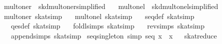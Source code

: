 \begin{isabellebody}
{}%
\endisatagML
{\isafoldML}%
%
\isadelimML
\isanewline
%
\endisadelimML
\isanewline
{}\isamarkupfalse%
\ mult{}oner\ {}\ skd{}mult{}oner{}simplified{}\isanewline
\ \ \ mult{}onel\ {}\ skd{}mult{}onel{}simplified{}\isanewline
\isanewline
{}\isamarkupfalse%
\ mult{}oner\ {}skat{}simp{}\isanewline
\ \ \ mult{}onel\ {}skat{}simp{}\isanewline
\ \ \ seq{}def\ {}skat{}simp{}\isanewline
\ \ \ qes{}def\ {}skat{}simp{}\isanewline
\ \ \ foldl{}simps\ {}skat{}simp{}\isanewline
\ \ \ rev{}simps\ {}skat{}simp{}\isanewline
\ \ \ append{}simps\ {}skat{}simp{}\isanewline
\isanewline
{}\isamarkupfalse%
\ seq{}singleton\ {}simp{}{}\ {}seq\ {}x{}\ {}\ x{}%
\isadelimproof
\ %
\endisadelimproof
%
\isatagproof
{}\isamarkupfalse%
\ skat{}reduce%

\end{isabellebody}
